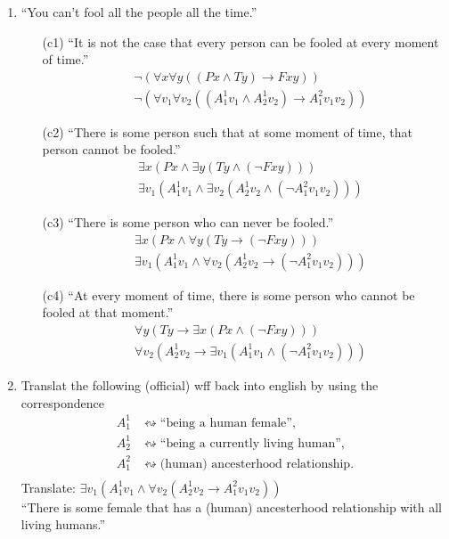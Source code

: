 \documentclass[11pt]{article}
\newcommand{\n}{\vspace{0.3cm}}
\begin{document}
\begin{enumerate}
    \item ``You can't fool all the people all the time.''
      \begin{enumerate}
        \item[(c1)] ``It is not the case that every person can be fooled at every moment of time.''
          \begin{align*}
            &\neg (\forall x \forall y ((P x \wedge T y) \to F x y)) \\
            &\neg (\forall v_1 \forall v_2 ((A_1^1 v_1 \wedge A_2^1 v_2) \to A_1^2 v_1 v_2))
          \end{align*}
        \item[(c2)] ``There is some person such that at some moment of time, that person cannot be fooled.''
          \begin{align*}
            &\exists x (P x \wedge \exists y (T y \wedge (\neg F x y))) \\
            &\exists v_1 (A_1^1 v_1 \wedge \exists v_2 (A_2^1 v_2 \wedge (\neg A_1^2 v_1 v_2)))
          \end{align*}
        \item[(c3)] ``There is some person who can never be fooled.''
          \begin{align*}
            &\exists x (P x \wedge \forall y (T y \to (\neg F x y))) \\
            &\exists v_1 (A_1^1 v_1 \wedge \forall v_2 (A_2^1 v_2 \to (\neg A_1^2 v_1 v_2)))
          \end{align*}
        \item[(c4)] ``At every moment of time, there is some person who cannot be fooled at that moment.''
          \begin{align*}
            &\forall y (T y \to \exists x (P x \wedge (\neg F x y))) \\
            &\forall v_2 (A_2^1 v_2 \to \exists v_1 (A_1^1 v_1 \wedge (\neg A_1^2 v_1 v_2)))
          \end{align*}
      \end{enumerate}

    \item Translat the following (official) wff back into english by using the correspondence
      \begin{align*}
        A_1^1 &\leftrightsquigarrow \text{``being a human female''}, \\
        A_2^1 &\leftrightsquigarrow \text{``being a currently living human''}, \\
        A_1^2 &\leftrightsquigarrow \text{(human) ancesterhood relationship}. \\
      \end{align*}
      Translate: \(\exists v_1 (A_1^1v_1 \wedge \forall v_2 (A_2^1v_2 \to A_1^2v_1v_2))\) \n\\
      ``There is some female that has a (human) ancesterhood relationship with all living humans.''


\end{enumerate}
\end{document}
